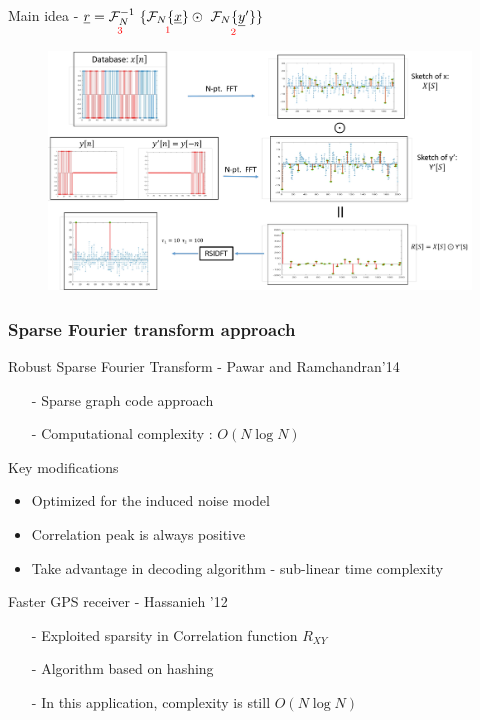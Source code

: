 \documentclass[10pt,xcolor=table]{beamer}
\newcommand{\xv}{\underline{x}}
\newcommand{\yv}{\underline{y}}
\newcommand{\rv}{\underline{r}}
\begin{document}
\begin{frame}{Main idea - $\rv = \underset{\text{\color{red} 3 } } {\mathcal{F}_{N}^{-1}} \ \{ \underset{\text{ \color{red} 1 } }{  \mathcal{F}_{N}\{\xv\}}  \odot \ \underset{\text{ \color{red} 2 } }{ \mathcal{F}_{N}\{\yv'\}}  \}$}

	\begin{figure}[t]
		\centering
		\includegraphics[width=4.8in]{Example_full_framework.pdf}
	\end{figure}
\end{frame}
\begin{frame}\frametitle{Sparse Fourier transform approach}
        \begin{block}{Robust Sparse Fourier Transform - Pawar and Ramchandran'14}
	 		\begin{itemize}
	 			\item[-] Sparse graph code approach
	 			\item[-] Computational complexity : $O(N \log N)$
	 		\end{itemize}
	 	\end{block}
\pause
\begin{block}{Key modifications}
   \begin{itemize}
   	\item Optimized for the induced noise model
   	\item Correlation peak is always {\color{blue} positive}
   	\item Take advantage in decoding algorithm - {\color{blue}sub-linear} time complexity
   \end{itemize}
\end{block}
\pause
        \begin{block}{Faster GPS receiver - Hassanieh '12}
	 		\begin{itemize}
	 			\item[-] Exploited sparsity in Correlation function $R_{XY}$
                \item[-] Algorithm based on hashing
                \item[-] In this application, complexity is still $O(N \log N)$
	 		\end{itemize}		
	 	\end{block}	 	


\end{frame}
\end{document}
